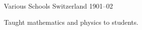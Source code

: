 \begin{cventries}

    {Various Schools} %
    {Switzerland} %
    {1901--02} %
    {
      \begin{cvitems}
        \item {Taught mathematics and physics to students.}
      \end{cvitems}
    }

\end{cventries}